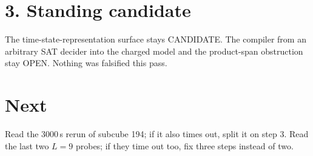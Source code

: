 \documentclass[11pt]{article}
\begin{document}
\section*{3. Standing candidate}
The time-state-representation surface stays CANDIDATE. The compiler from an arbitrary SAT decider into the charged model and the product-span obstruction stay OPEN. Nothing was falsified this pass.

\section*{Next}
Read the 3000\,s rerun of subcube 194; if it also times out, split it on step 3. Read the last two $L=9$ probes; if they time out too, fix three steps instead of two.
\end{document}
